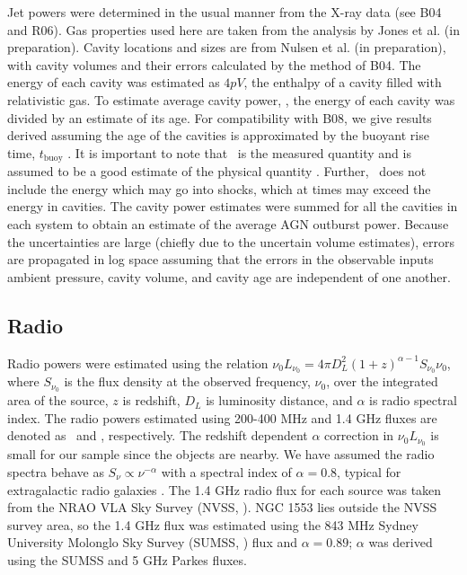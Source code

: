 \documentclass{emulateapj}
\begin{document}
Jet powers were determined in the usual manner from the X-ray data
(see B04 and R06). Gas properties used here are taken from the
analysis by Jones et al. (in preparation). Cavity locations and sizes
are from Nulsen et al. (in preparation), with cavity volumes and their
errors calculated by the method of B04. The energy of each cavity was
estimated as $4pV$, the enthalpy of a cavity filled with relativistic
gas. To estimate average cavity power, \pcav, the energy of each
cavity was divided by an estimate of its age. For compatibility with
B08, we give results derived assuming the age of the cavities is
approximated by the buoyant rise time, $t_{\mathrm{buoy}}$
\citep{2001ApJ...554..261C, 2003ApJ...592..839B}. It is important to
note that \pcav\ is the measured quantity and is assumed to be a good
estimate of the physical quantity \pjet. Further, \pcav\ does not
include the energy which may go into shocks, which at times may exceed
the energy in cavities. The cavity power estimates were summed for all
the cavities in each system to obtain an estimate of the average AGN
outburst power. Because the uncertainties are large (chiefly due to
the uncertain volume estimates), errors are propagated in log space
assuming that the errors in the observable inputs ambient pressure,
cavity volume, and cavity age are independent of one another.

\subsection{Radio}
\label{sec:radio}

Radio powers were estimated using the relation $\nu_0 L_{\nu_0} = 4
\pi D_L^2 (1+z)^{\alpha-1} S_{\nu_0} \nu_0$, where $S_{\nu_0}$ is the
flux density at the observed frequency, $\nu_0$, over the integrated
area of the source, $z$ is redshift, $D_L$ is luminosity distance, and
$\alpha$ is radio spectral index. The radio powers estimated using
200-400 MHz and 1.4 GHz fluxes are denoted as \plow\ and \phigh,
respectively. The redshift dependent $\alpha$ correction in $\nu_0
L_{\nu_0}$ is small for our sample since the objects are nearby. We
have assumed the radio spectra behave as $S_{\nu} \propto
\nu^{-\alpha}$ with a spectral index of $\alpha = 0.8$, typical for
extragalactic radio galaxies \citep{1992ARA&A..30..575C}. The 1.4 GHz
radio flux for each source was taken from the NRAO VLA Sky Survey
(NVSS, \citealt{nvss}). NGC 1553 lies outside the NVSS survey area, so
the 1.4 GHz flux was estimated using the 843 MHz Sydney University
Molonglo Sky Survey (SUMSS, \citealt{sumss1}) flux and $\alpha =
0.89$; $\alpha$ was derived using the SUMSS and 5 GHz Parkes
\citep{1970ApL.....5...29W} fluxes.
\end{document}
